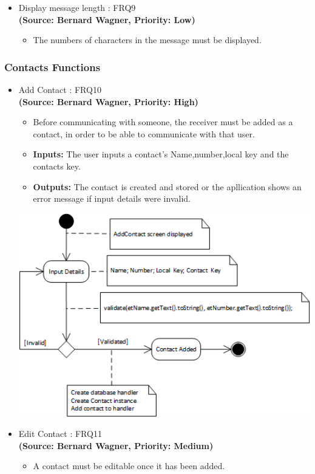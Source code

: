 \begin{itemize}
\item{Display message length : FRQ9}\\
\textbf{(Source: Bernard Wagner, Priority: Low)}
\begin{itemize}
\item The numbers of characters in the message must be displayed.
\end{itemize}
\end{itemize}
\subsubsection{Contacts Functions}
\begin{itemize}
\item{Add Contact : FRQ10}\\
\textbf{(Source: Bernard Wagner, Priority: High)}
\begin{itemize}
\item Before communicating with someone, the receiver must be added as a contact, in order to be able to communicate with that user.
\item \textbf{Inputs:} The user inputs a contact's Name,number,local key and the contacts key.
\item \textbf{Outputs:} The contact is created and stored or the apllication shows an error message if input details were invalid.
\end{itemize}
 \includegraphics[width=13cm]{diagrams/StateDiagrams/AddContactStateDiagram.png}
\item{Edit Contact : FRQ11}\\
\textbf{(Source: Bernard Wagner, Priority: Medium)}
\begin{itemize}
\item A contact must be editable once it has been added.

\end{itemize}
\end{itemize}
